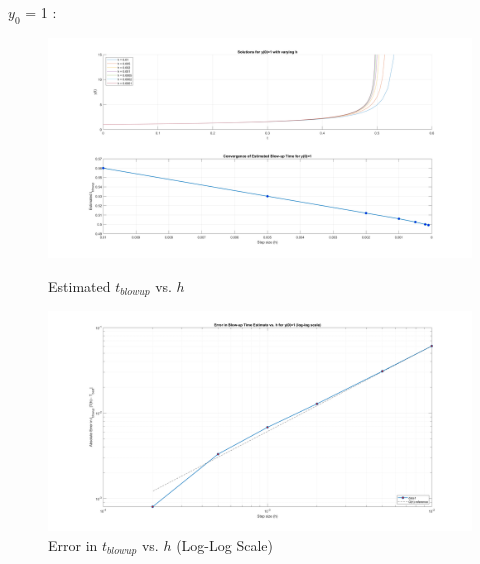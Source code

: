 \documentclass{article}
\begin{document}
$y_0$ = 1 :
\begin{figure}[htbp]
    \centering
    \begin{minipage}[b]{0.45\textwidth}
        \centering
        \includegraphics[width=\textwidth]{pic/euler_err1-1.png }
        \caption{Estimated $t_{blowup}$ vs. $h$}
        \label{fig:image1}
    \end{minipage}
    \hspace{0.05\textwidth}
    \begin{minipage}[b]{0.45\textwidth}
        \centering
        \includegraphics[width=\textwidth]{pic/euler_err1-2.png}
        \caption{Error in $t_{blowup}$ vs. $h$ (Log-Log Scale) }
        \label{fig:image2}
    \end{minipage}
\end{figure}
\end{document}
